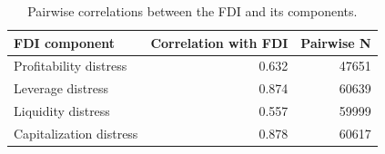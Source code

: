 \begin{table}
\caption{Pairwise correlations between the FDI and its components.}
\label{tab:fdi_component_correlations}
\begin{tabular}{lrr}
\toprule
FDI component & Correlation with FDI & Pairwise N \\
\midrule
Profitability distress & 0.632 & 47651 \\
Leverage distress & 0.874 & 60639 \\
Liquidity distress & 0.557 & 59999 \\
Capitalization distress & 0.878 & 60617 \\
\bottomrule
\end{tabular}
\end{table}
